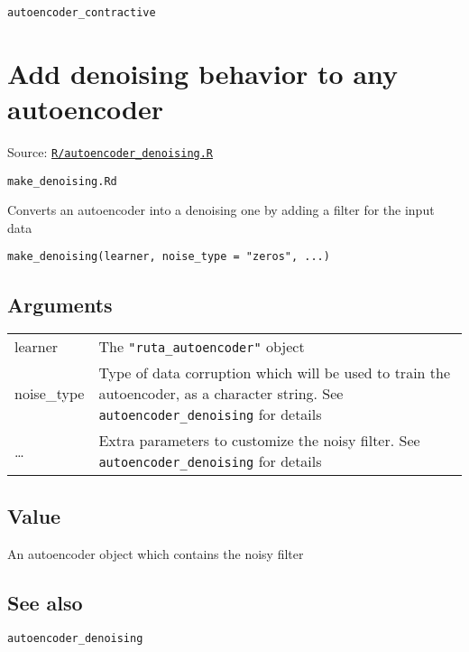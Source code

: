 \texttt{autoencoder\_contractive}

\section{Add denoising behavior to any
autoencoder}\label{add-denoising-behavior-to-any-autoencoder}

Source:
\href{https://github.com/fdavidcl/ruta/blob/master/R/autoencoder_denoising.R}{\texttt{R/autoencoder\_denoising.R}}

\texttt{make\_denoising.Rd}

Converts an autoencoder into a denoising one by adding a filter for the
input data

\begin{verbatim}
make_denoising(learner, noise_type = "zeros", ...)
\end{verbatim}

\hypertarget{arguments}{\subsection{\texorpdfstring{\protect\hyperlink{arguments}{}Arguments}{Arguments}}\label{arguments}}

\begin{longtable}[c]{@{}ll@{}}
\toprule
learner & The \texttt{"ruta\_autoencoder"} object\tabularnewline
noise\_type & Type of data corruption which will be used to train the
autoencoder, as a character string. See \texttt{autoencoder\_denoising}
for details\tabularnewline
\ldots{} & Extra parameters to customize the noisy filter. See
\texttt{autoencoder\_denoising} for details\tabularnewline
\bottomrule
\end{longtable}

\hypertarget{value}{\subsection{\texorpdfstring{\protect\hyperlink{value}{}Value}{Value}}\label{value}}

An autoencoder object which contains the noisy filter

\hypertarget{see-also}{\subsection{\texorpdfstring{\protect\hyperlink{see-also}{}See
also}{See also}}\label{see-also}}

\texttt{autoencoder\_denoising}

